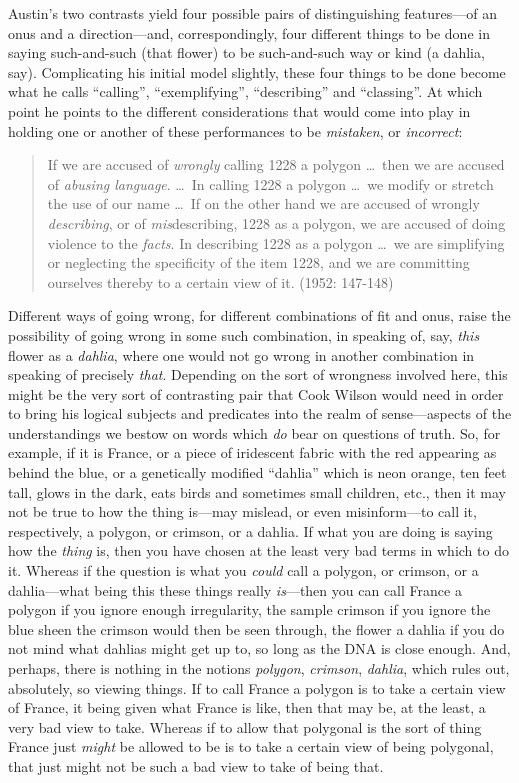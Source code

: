 Austin's two contrasts yield four possible pairs of distinguishing features---of an onus and a direction---and, correspondingly, four different things to be done in saying such-and-such (that flower) to be such-and-such way or kind (a dahlia, say). Complicating his initial model slightly, these four things to be done become what he calls ``calling'', ``exemplifying'', ``describing'' and ``classing''. At which point he points to the different considerations that would come into play in holding one or another of these performances to be \emph{mistaken}, or \emph{incorrect}:
\begin{quote}
	If we are accused of \emph{wrongly} calling 1228 a polygon \ldots\ then we are accused of \emph{abusing language}. \ldots\ In calling 1228 a polygon \ldots\ we modify or stretch the use of our name \ldots\ If on the other hand we are accused of wrongly \emph{describing}, or of \emph{mis}describing, 1228 as a polygon, we are accused of doing violence to the \emph{facts}. In describing 1228 as a polygon \ldots\ we are simplifying or neglecting the specificity of the item 1228, and we are committing ourselves thereby to a certain view of it. (1952: 147-148)
\end{quote}
Different ways of going wrong, for different combinations of fit and onus, raise the possibility of going wrong in some such combination, in speaking of, say, \emph{this} flower as a \emph{dahlia}, where one would not go wrong in another combination in speaking of precisely \emph{that}. Depending on the sort of wrongness involved here, this might be the very sort of contrasting pair that Cook Wilson would need in order to bring his logical subjects and predicates into the realm of sense---aspects of the understandings we bestow on words which \emph{do} bear on questions of truth. So, for example, if it is France, or a piece of iridescent fabric with the red appearing as behind the blue, or a genetically modified ``dahlia'' which is neon orange, ten feet tall, glows in the dark, eats birds and sometimes small children, etc., then it may not be true to how the thing is---may mislead, or even misinform---to call it, respectively, a polygon, or crimson, or a dahlia. If what you are doing is saying how the \emph{thing} is, then you have chosen at the least very bad terms in which to do it. Whereas if the question is what you \emph{could} call a polygon, or crimson, or a dahlia---what being this these things really \emph{is}---then you can call France a polygon if you ignore enough irregularity, the sample crimson if you ignore the blue sheen the crimson would then be seen through, the flower a dahlia if you do not mind what dahlias might get up to, so long as the DNA is close enough. And, perhaps, there is nothing in the notions \emph{polygon}, \emph{crimson}, \emph{dahlia}, which rules out, absolutely, so viewing things. If to call France a polygon is to take a certain view of France, it being given what France is like, then that may be, at the least, a very bad view to take. Whereas if to allow that polygonal is the sort of thing France just \emph{might} be allowed to be is to take a certain view of being polygonal, that just might not be such a bad view to take of being that.

